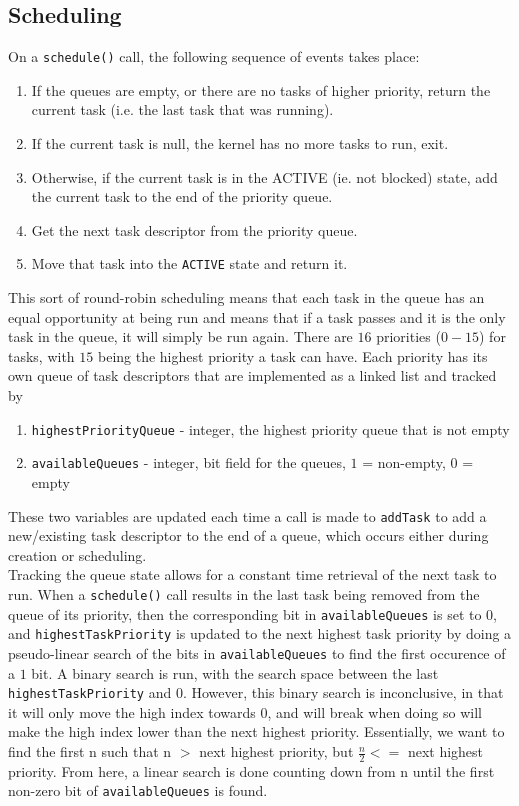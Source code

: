 \documentclass[12pt]{article}
\begin{document}
\subsection{Scheduling}
On a \texttt{schedule()} call, the following sequence of events takes place:
\begin{enumerate}
  \item If the queues are empty, or there are no tasks of higher priority, return the current task (i.e. the last task that was running).
  \item If the current task is null, the kernel has no more tasks to run, exit.
  \item Otherwise, if the current task is in the ACTIVE (ie. not blocked) state, add the current task to the end of the priority queue.
  \item Get the next task descriptor from the priority queue.
  \item Move that task into the \texttt{ACTIVE} state and return it.
\end{enumerate}
This sort of round-robin scheduling means that each task in the queue has an equal opportunity at being run and means that if a task passes and it is the only task in the queue, it will simply be run again.  There are $16$ priorities ($0 - 15$) for tasks, with $15$ being the highest priority a task can have.  Each priority has its own queue of task descriptors that are implemented as a linked list and tracked by
\begin{enumerate}
  \item \texttt{highestPriorityQueue} - integer, the highest priority queue that is not empty
  \item \texttt{availableQueues} - integer, bit field for the queues, $1$ = non-empty, $0$ = empty
\end{enumerate}
These two variables are updated each time a call is made to \texttt{addTask} to add a new/existing task descriptor to the end of a queue, which occurs either during creation or scheduling.\\

Tracking the queue state allows for a constant time retrieval of the next task to run.  When a \texttt{schedule()} call results in the last task being removed from the queue of its priority, then the corresponding bit in \texttt{availableQueues} is set to $0$, and \texttt{highestTaskPriority} is updated to the next highest task priority by doing a pseudo-linear search of the bits in \texttt{availableQueues} to find the first occurence of a $1$ bit.  A binary search is run, with the search space between the last \texttt{highestTaskPriority} and $0$.  However, this binary search is inconclusive, in that it will only move the high index towards 0, and will break when doing so will make the high index lower than the next highest priority. Essentially, we want to find the first n such that n $>$ next highest priority, but $\frac{n}{2} <=$ next highest priority. From here, a linear search is done counting down from n until the first non-zero bit of \texttt{availableQueues} is found. \\
\end{document}
